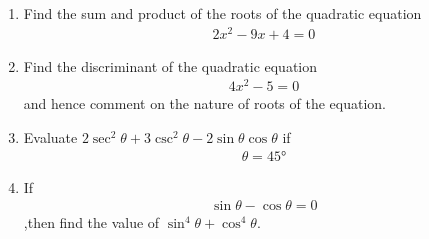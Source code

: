 \documentclass{article}
\begin{document}
\begin{enumerate}
\begin{enumerate}
   \end{enumerate}
   \item  Find the sum and product of the roots of the quadratic equation 
   \begin{align}
       2x^2-9x+4=0
   \end{align}
   \item Find the discriminant of the quadratic equation 
   \begin{align}
       4x^2-5=0
   \end{align}
   and hence comment on the nature of roots of the equation.
   \item Evaluate $2\sec^2\theta+3\csc^2\theta-2\sin\theta\cos\theta$ if
   \begin{align}
        \theta=45\si{\degree}
   \end{align}
  
   \item If
   \begin{align}
       \sin\theta-\cos\theta=0
   \end{align}
   ,then find the value of $\sin^4\theta+\cos^4\theta$.
\end{enumerate}
\end{document}
